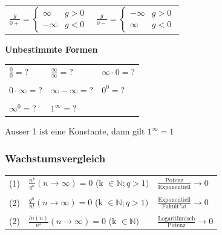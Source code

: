 				\begin{tabular}{ll}
				$\frac{g}{0+} = \begin{cases}					
								\infty & g > 0 \\
								-\infty & g < 0
								\end{cases} $ &
				$\frac{g}{0-} = \begin{cases}				
								-\infty & g > 0 \\
								\infty & g < 0
								\end{cases}$ \\ 
				\end{tabular}
			
			\textbf{Unbestimmte Formen} \\
				\begin{tabular}{lll}
					$\frac{0}{0} = ?$    & $\frac{\infty}{\infty} = ?$ & $\infty \cdot 0 = ?$ \\
					\\
					$0 \cdot \infty = ?$ & $\infty - \infty = ?$       & $0^0 = ?$ \\
					\\
					$\infty^0 = ?$       & $1^{\infty} = ?$            & \\
				\end{tabular}
			
				Ausser 1 ist eine Konstante, dann gilt $1^{\infty} = 1 $ \\
				
		\subsubsection{Wachstumsvergleich} 
			\begin{tabular}{lll}
				(1) & $\frac{n^k}{q^n} (n \rightarrow \infty)= 0$  (k $\in \mathbb{N}; q > 1)$ & $\frac{\text{Potenz}}{\text{Exponentiell}} \rightarrow 0$\\
				\\
				(2) & $\frac{q^n}{n!} (n \rightarrow \infty)= 0$  (k $\in \mathbb{N}; q > 1)$  & $\frac{\text{Exponentiell}}{\text{Fakult"at}} \rightarrow 0$ \\
				\\
				(2) & $\frac{ln(n)}{n^k} (n \rightarrow \infty)= 0$  (k $\in \mathbb{N})$      & $\frac{\text{Logarithmisch}}{\text{Potenz}} \rightarrow 0$ \\
			\end{tabular}						
				

